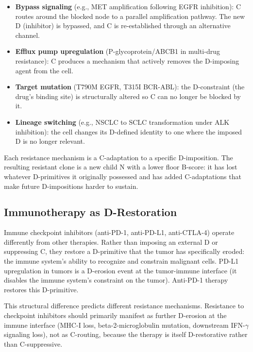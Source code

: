 \documentclass[12pt]{article}
\providecommand{\tightlist}{%
  \setlength{\itemsep}{0pt}\setlength{\parskip}{0pt}}
\begin{document}
\begin{itemize}
\tightlist
\item
  \textbf{Bypass signaling} (e.g., MET amplification following EGFR
  inhibition): C routes around the blocked node to a parallel
  amplification pathway. The new D (inhibitor) is bypassed, and C is
  re-established through an alternative channel.
\item
  \textbf{Efflux pump upregulation} (P-glycoprotein/ABCB1 in multi-drug
  resistance): C produces a mechanism that actively removes the
  D-imposing agent from the cell.
\item
  \textbf{Target mutation} (T790M EGFR, T315I BCR-ABL): the D-constraint
  (the drug's binding site) is structurally altered so C can no longer
  be blocked by it.
\item
  \textbf{Lineage switching} (e.g., NSCLC to SCLC transformation under
  ALK inhibition): the cell changes its D-defined identity to one where
  the imposed D is no longer relevant.
\end{itemize}

Each resistance mechanism is a C-adaptation to a specific D-imposition.
The resulting resistant clone is a new child N with a lower floor
B-score: it has lost whatever D-primitives it originally possessed and
has added C-adaptations that make future D-impositions harder to
sustain.

\subsection{Immunotherapy as D-Restoration}\label{immunotherapy-as-d-restoration}

Immune checkpoint inhibitors (anti-PD-1, anti-PD-L1, anti-CTLA-4)
operate differently from other therapies. Rather than imposing an
external D or suppressing C, they restore a D-primitive that the tumor
has specifically eroded: the immune system's ability to recognize and
constrain malignant cells. PD-L1 upregulation in tumors is a D-erosion
event at the tumor-immune interface (it disables the immune system's
constraint on the tumor). Anti-PD-1 therapy restores this D-primitive.

This structural difference predicts different resistance mechanisms.
Resistance to checkpoint inhibitors should primarily manifest as further
D-erosion at the immune interface (MHC-I loss, beta-2-microglobulin
mutation, downstream IFN-\(\gamma\) signaling loss), not as C-routing,
because the therapy is itself D-restorative rather than C-suppressive.
\end{document}
